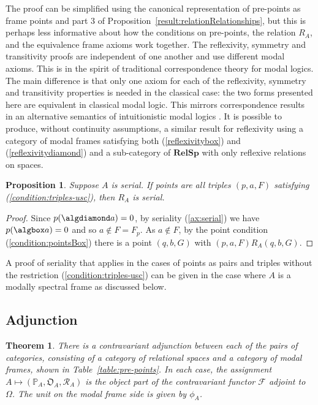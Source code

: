 \documentclass{article}[a4paper]
\newtheorem{theorem}{Theorem}%
\newtheorem{proposition}{Proposition}%
\theoremstyle{definition}
\newcommand{\Fcal}{\mathcal{F}} %
\newcommand{\relsp}{\mathbf{RelSp}}
\begin{document}
The proof can be simplified using the canonical representation of pre-points as frame points and part 3 of Proposition~\ref{result:relationRelationships}, but this is perhaps less informative about how the conditions on pre-points, the relation $R_A$, and the equivalence frame axioms work together.
The reflexivity, symmetry and transitivity proofs are independent of one another and use different modal axioms. This is in the spirit of traditional correspondence theory for modal logics. The main difference is that only one axiom for each of the reflexivity, symmetry and transitivity properties is needed in the classical case: the two forms presented here are equivalent in classical modal logic. This mirrors  correspondence results in an alternative semantics of intuitionistic modal logics \cite{simpson94}.
It is possible to produce, without continuity assumptions, a similar result for reflexivity using a category of modal frames satisfying both (\ref{reflexivitybox}) and (\ref{reflexivitydiamond}) and a sub-category of $\relsp$ with only reflexive relations on spaces. 

\begin{proposition}
    Suppose $A$ is serial. If points are all triples $(p,a,F)$ satisfying (\ref{condition:triples-usc}), then 
    $R_A$ is serial. 
\end{proposition}

\begin{proof}
Since $p(\algdiamond a) = 0$, by seriality (\ref{ax:serial}) we have $p(\algbox a) = 0$ and so $a \notin F=F_p$. As $a \notin F$, by the point condition (\ref{condition:pointsBox}) there is a point $(q,b,G)$ with $(p,a,F) R_A (q,b, G)$. 
\end{proof}

A proof of seriality that applies in the cases of points as pairs and triples without the restriction (\ref{condition:triples-usc}) can be given in the case where $A$ is a modally spectral frame as discussed below.


\subsection{Adjunction}

\begin{theorem}
\label{result:adjunction}
There is a contravariant adjunction between each of the pairs of categories, consisting of a category of relational spaces and a category of modal frames, shown in Table~\ref{table:pre-points}. 
In each case, the assignment
$A \mapsto ( \mathbb{P} _A , \mathfrak{O} _A, \mathcal{R} _A )$ 
is the object part of the contravariant functor $\Fcal$  adjoint to 
$\Omega$. 
The unit on the modal frame side is given by $\phi _A$.
\end{theorem} 
\end{document}
